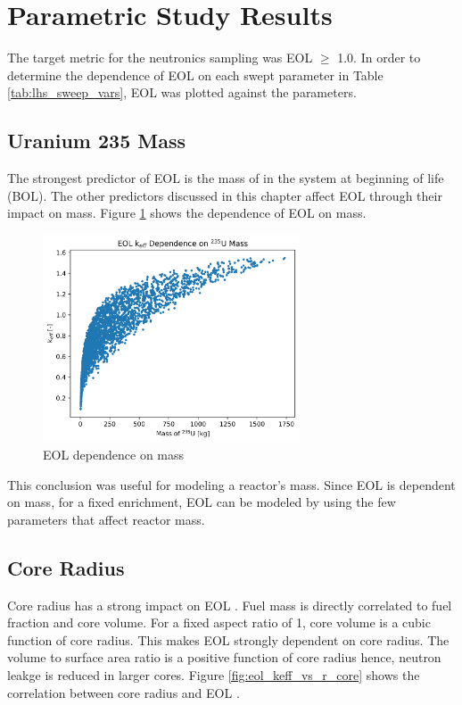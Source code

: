 \section{Parametric Study Results}
The target metric for the neutronics sampling was EOL \keff $\geq$ 1.0. In
order to determine the dependence of EOL \keff on each swept parameter in Table
\ref{tab:lhs_sweep_vars}, EOL \keff was plotted against the parameters.

\subsection{Uranium 235 Mass}
The strongest predictor of EOL \keff is the mass of \uran
in the system at beginning of life (BOL). The other predictors discussed 
in this chapter affect EOL \keff
through their impact on \uran mass. Figure \ref{fig:eol_keff_vs_235_mass} 
shows the dependence of EOL \keff on \uran mass.

\begin{figure}[h]
    \centering
    \includegraphics[width=3in]{../images/keff_vs_mass_235.png}
\caption{EOL \keff dependence on \uran mass}
\label{fig:eol_keff_vs_235_mass}
\end{figure}

This conclusion was useful for modeling a reactor's mass. Since EOL \keff is
dependent on \uran mass, for a fixed enrichment, EOL \keff can be modeled by
using the few parameters that affect reactor mass.

\subsection{Core Radius}
Core radius has a strong impact on EOL \keff. Fuel mass is directly correlated
to fuel fraction and core volume. For a fixed aspect ratio of 1, core volume is
a cubic function of core radius. This makes EOL \keff strongly dependent on core
radius. The volume to surface area ratio is a positive function of core radius
hence, neutron leakge is reduced in larger cores. Figure
\ref{fig:eol_keff_vs_r_core} shows the correlation between core radius and EOL
\keff.

